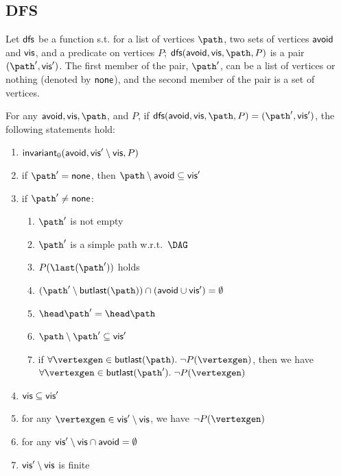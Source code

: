 \subsection{DFS}

\newcommand{\dfs}[0]{\textsf{\upshape dfs}}
\newcommand{\vis}[0]{\textsf{\upshape vis}}
\newcommand{\avoid}[0]{\textsf{\upshape avoid}}
\renewcommand{\invariant}[0]{\textsf{\upshape invariant}}
\newcommand{\none}[0]{\textsf{\upshape none}}

Let $\dfs$ be a function s.t. for a list of vertices $\path$, two sets of vertices $\avoid$ and $\vis$, and a predicate on vertices $P$; $\dfs(\avoid,\vis,\path,P)$ is a pair $(\path',\vis')$.
The first member of the pair, $\path'$, can be a list of vertices or nothing (denoted by $\none$), and the second member of the pair is a set of vertices.

\begin{myproperty}
  \label{property:dfs}
  For any $\avoid,\vis,\path$, and $P$, if $\dfs(\avoid,\vis,\path,P) = (\path',\vis')$, %
the following statements hold:
  \begin{enumerate}
  \item {\label{property:dfs:1} $\invariant_0(\avoid,\vis'\setminus\vis,P)$}
  \item {\label{property:dfs:2}if $\path' = \none$, then $\path \setminus \avoid\subseteq \vis'$}
  \item if $\path'\neq\none$:
    \begin{enumerate}
    \item {\label{property:dfs:12}$\path'$ is not empty}
    \item {\label{property:dfs:3}$\path'$ is a simple path w.r.t.\ $\DAG$}
    \item {\label{property:dfs:4}$P(\last(\path'))$ holds}
    \item {\label{property:dfs:5}$(\path'\setminus\butlast(\path))\cap(\avoid\cup\vis') = \emptyset$}
    \item {\label{property:dfs:6}$\head \path' = \head \path$}
    \item {\label{property:dfs:7}$\path\setminus\path'\subseteq\vis'$}
    \item {\label{property:dfs:11}if $\forall\vertexgen\in\butlast(\path).\;\neg P(\vertexgen)$, then we have $\forall\vertexgen\in\butlast(\path').\;\neg P(\vertexgen)$}
    \end{enumerate}
  \item {\label{property:dfs:8}$\vis \subseteq \vis'$}
  \item {\label{property:dfs:9}for any $\vertexgen\in\vis'\setminus\vis$, we have $\neg P (\vertexgen)$}
  \item {\label{property:dfs:10}for any $\vis'\setminus\vis\cap \avoid=\emptyset$}
  \item {\label{property:dfs:13}$\vis'\setminus \vis$ is finite}
  
  \end{enumerate}
\end{myproperty}

